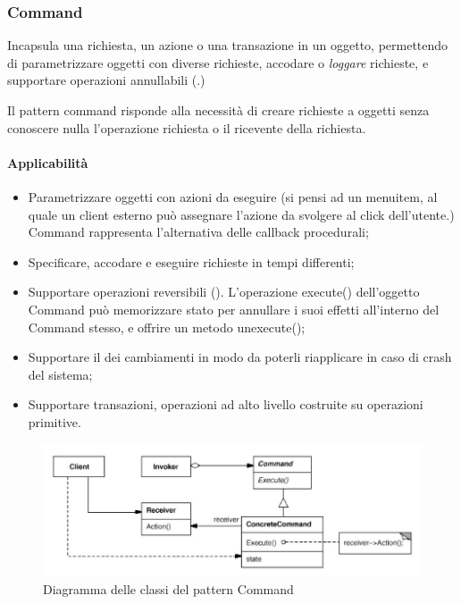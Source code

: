 \subsubsection{Command} %
\label{ssub:command}

Incapsula una richiesta, un azione o una transazione in un oggetto, permettendo
di parametrizzare oggetti con diverse richieste, accodare o \emph{loggare}
richieste, e supportare operazioni annullabili (.)

Il pattern command risponde alla necessità di creare richieste a oggetti senza
conoscere nulla l'operazione richiesta o il ricevente della richiesta.

\paragraph{Applicabilità} %
\label{par:applicabilit_}

\begin{itemize}
  \item Parametrizzare oggetti con azioni da eseguire (si pensi ad un menuitem,
    al quale un client esterno può assegnare l'azione da svolgere al click
    dell'utente.) Command rappresenta l'alternativa 
    delle callback procedurali;
  \item Specificare, accodare e eseguire richieste in tempi differenti;
  \item Supportare operazioni reversibili ().
    L'operazione execute() dell'oggetto Command può memorizzare stato per
    annullare i suoi effetti all'interno del Command stesso, e offrire un metodo
    unexecute();
  \item Supportare il  dei cambiamenti in modo da poterli
    riapplicare in caso di crash del sistema;
  \item Supportare transazioni, operazioni ad alto livello costruite su
    operazioni primitive.
\end{itemize}

\begin{figure}
  \centering
  \includegraphics[scale=0.5]{imgs/command}
  \caption{Diagramma delle classi del pattern Command}
\end{figure}

